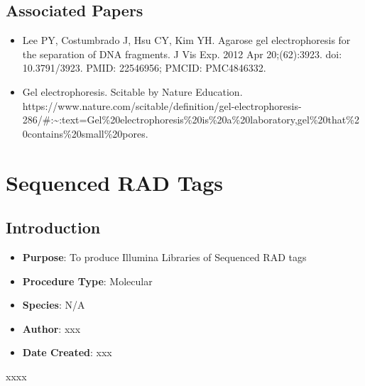\documentclass[
  letterpaper,
  DIV=11,
  numbers=noendperiod]{scrreprt}
\providecommand{\tightlist}{%
  \setlength{\itemsep}{0pt}\setlength{\parskip}{0pt}}\usepackage{longtable,booktabs,array}
\begin{document}
\hypertarget{associated-papers-14}{%
\section{Associated Papers}\label{associated-papers-14}}

\begin{itemize}
\tightlist
\item
  Lee PY, Costumbrado J, Hsu CY, Kim YH. Agarose gel electrophoresis for
  the separation of DNA fragments. J Vis Exp. 2012 Apr 20;(62):3923.
  doi: 10.3791/3923. PMID: 22546956; PMCID: PMC4846332.
\item
  Gel electrophoresis. Scitable by Nature Education.
  https://www.nature.com/scitable/definition/gel-electrophoresis-286/\#:\textasciitilde:text=Gel\%20electrophoresis\%20is\%20a\%20laboratory,gel\%20that\%20contains\%20small\%20pores.
\end{itemize}

\hypertarget{sec-molecular-RADseq}{%
\chapter{Sequenced RAD Tags}\label{sec-molecular-RADseq}}

\hypertarget{introduction-23}{%
\section{Introduction}\label{introduction-23}}

\begin{itemize}
\tightlist
\item
  \textbf{Purpose}: To produce Illumina Libraries of Sequenced RAD tags
\item
  \textbf{Procedure Type}: Molecular
\item
  \textbf{Species}: N/A
\item
  \textbf{Author}: xxx
\item
  \textbf{Date Created}: xxx
\end{itemize}

\begin{tcolorbox}[enhanced jigsaw, toprule=.15mm, breakable, coltitle=black, leftrule=.75mm, title=\textcolor{quarto-callout-warning-color}{\faExclamationTriangle}\hspace{0.5em}{NOTES}, bottomrule=.15mm, toptitle=1mm, bottomtitle=1mm, colframe=quarto-callout-warning-color-frame, opacityback=0, colback=white, opacitybacktitle=0.6, colbacktitle=quarto-callout-warning-color!10!white, rightrule=.15mm, titlerule=0mm, arc=.35mm, left=2mm]

xxxx

\end{tcolorbox}
\end{document}

